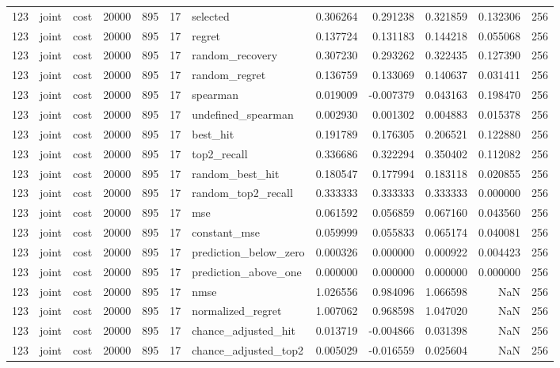 \begin{tabular}{rllrrrlrrrrr}
123 & joint & cost & 20000 & 895 & 17 & selected & 0.306264 & 0.291238 & 0.321859 & 0.132306 & 256 \\
123 & joint & cost & 20000 & 895 & 17 & regret & 0.137724 & 0.131183 & 0.144218 & 0.055068 & 256 \\
123 & joint & cost & 20000 & 895 & 17 & random_recovery & 0.307230 & 0.293262 & 0.322435 & 0.127390 & 256 \\
123 & joint & cost & 20000 & 895 & 17 & random_regret & 0.136759 & 0.133069 & 0.140637 & 0.031411 & 256 \\
123 & joint & cost & 20000 & 895 & 17 & spearman & 0.019009 & -0.007379 & 0.043163 & 0.198470 & 256 \\
123 & joint & cost & 20000 & 895 & 17 & undefined_spearman & 0.002930 & 0.001302 & 0.004883 & 0.015378 & 256 \\
123 & joint & cost & 20000 & 895 & 17 & best_hit & 0.191789 & 0.176305 & 0.206521 & 0.122880 & 256 \\
123 & joint & cost & 20000 & 895 & 17 & top2_recall & 0.336686 & 0.322294 & 0.350402 & 0.112082 & 256 \\
123 & joint & cost & 20000 & 895 & 17 & random_best_hit & 0.180547 & 0.177994 & 0.183118 & 0.020855 & 256 \\
123 & joint & cost & 20000 & 895 & 17 & random_top2_recall & 0.333333 & 0.333333 & 0.333333 & 0.000000 & 256 \\
123 & joint & cost & 20000 & 895 & 17 & mse & 0.061592 & 0.056859 & 0.067160 & 0.043560 & 256 \\
123 & joint & cost & 20000 & 895 & 17 & constant_mse & 0.059999 & 0.055833 & 0.065174 & 0.040081 & 256 \\
123 & joint & cost & 20000 & 895 & 17 & prediction_below_zero & 0.000326 & 0.000000 & 0.000922 & 0.004423 & 256 \\
123 & joint & cost & 20000 & 895 & 17 & prediction_above_one & 0.000000 & 0.000000 & 0.000000 & 0.000000 & 256 \\
123 & joint & cost & 20000 & 895 & 17 & nmse & 1.026556 & 0.984096 & 1.066598 & NaN & 256 \\
123 & joint & cost & 20000 & 895 & 17 & normalized_regret & 1.007062 & 0.968598 & 1.047020 & NaN & 256 \\
123 & joint & cost & 20000 & 895 & 17 & chance_adjusted_hit & 0.013719 & -0.004866 & 0.031398 & NaN & 256 \\
123 & joint & cost & 20000 & 895 & 17 & chance_adjusted_top2 & 0.005029 & -0.016559 & 0.025604 & NaN & 256 \\

\end{tabular}
